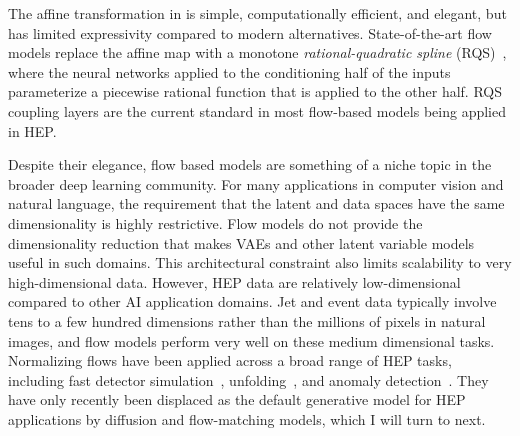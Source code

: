 The affine transformation in  is simple, computationally efficient, and elegant, but has limited expressivity compared to modern alternatives.
State-of-the-art flow models replace the affine map with a monotone \textit{rational-quadratic spline} (RQS)~\cite{Durkan:2019nsf}, where the neural networks applied to the conditioning half of the inputs parameterize a piecewise rational function that is applied to the other half.
RQS coupling layers are the current standard in most flow-based models being applied in HEP.

Despite their elegance, flow based models are something of a niche topic in the broader deep learning community.
For many applications in computer vision and natural language, the requirement that the latent and data spaces have the same dimensionality is highly restrictive.
Flow models do not provide the dimensionality reduction that makes VAEs and other latent variable models useful in such domains.
This architectural constraint also limits scalability to very high-dimensional data.
However, HEP data are relatively low-dimensional compared to other AI application domains.
Jet and event data typically involve tens to a few hundred dimensions rather than the millions of pixels in natural images, and flow models perform very well on these medium dimensional tasks.
Normalizing flows have been applied across a broad range of HEP tasks, including fast detector simulation~\cite{Krause:2021ilc}, unfolding~\cite{Bellagente:2020piv}, and anomaly detection~\cite{Hallin:2021wme}.
They have only recently been displaced as the default generative model for HEP applications by diffusion and flow-matching models, which I will turn to next.
